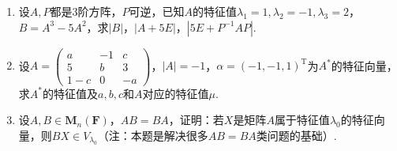 \begin{enumerate}
    \item 设$A,P$都是3阶方阵，$P$可逆，已知$A$的特征值$\lambda_1=1,\lambda_2=-1,\lambda_3=2$，$B=A^3-5A^2$，求$|B|$，$|A+5E|$，$|5E+P^{-1}AP|$.

    \item 设$A=\begin{pmatrix}
                  a & -1 & c \\ 5 & b & 3 \\ 1-c & 0 & -a
              \end{pmatrix}$，$|A|=-1$，$\alpha=(-1,-1,1)^\mathrm{T}$为$A^*$的特征向量，求$A^*$的特征值及$a,b,c$和$A$对应的特征值$\mu$.

    \item 设$A,B\in \mathbf{M}_n(\mathbf{F})$，$AB=BA$，证明：若$X$是矩阵$A$属于特征值$\lambda_0$的特征向量，则$BX\in V_{\lambda_0}$（注：本题是解决很多$AB=BA$类问题的基础）.
\end{enumerate}

